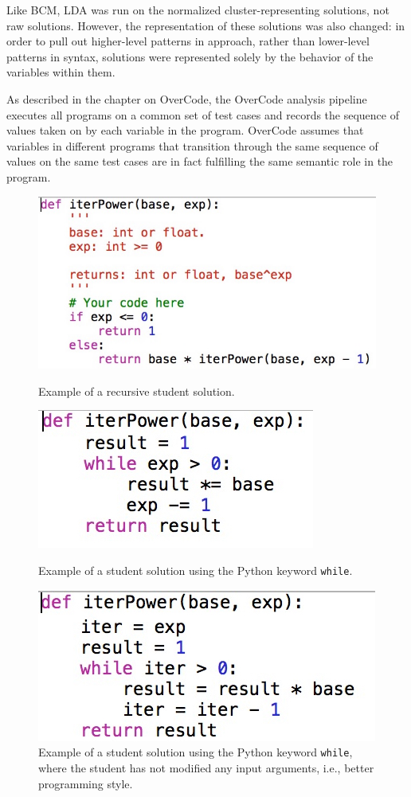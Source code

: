 Like BCM, LDA was run on the normalized cluster-representing solutions, not raw solutions. However, the representation of these solutions was also changed: in order to pull out higher-level patterns in approach, rather than lower-level patterns in syntax, solutions were represented solely by the behavior of the variables within them. 

As described in the chapter on OverCode, the OverCode analysis pipeline executes all programs on a common set of test cases and records the sequence of values taken on by each variable in the program. OverCode assumes that variables in different programs that transition through the same sequence of values on the same test cases are in fact fulfilling the same semantic role in the program. %



\begin{figure}[ht]
\includegraphics[width=0.75\columnwidth]{Body/figures/grovercode/recursive_example}
\caption{Example of a recursive student solution.}
\label{recursive_example}
\vspace*{\floatsep}
\includegraphics[width=0.45\columnwidth]{Body/figures/grovercode/whilestandard}
\caption{Example of a student solution using the Python keyword \texttt{while}.}
\label{whilestandard}
\vspace*{\floatsep}
\includegraphics[width=0.5\columnwidth]{Body/figures/grovercode/augmentedwhile}
\caption{Example of a student solution using the Python keyword \texttt{while}, where the student has not modified any input arguments, i.e., better programming style.}
\label{augmentedwhile}
\end{figure} 

